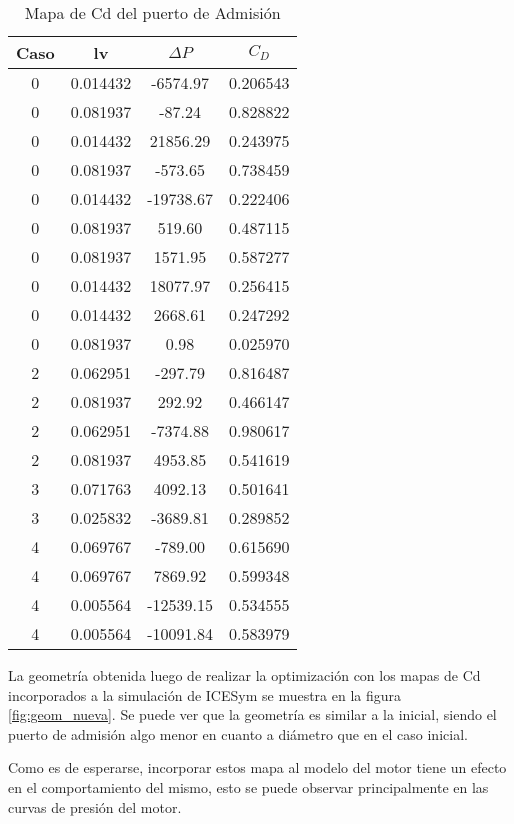 \begin{table}
  \centering
  \begin{tabular}{cccc} \toprule
      Caso  & lv        & $\Delta P$    & $C_{D}$   \\ \midrule
      0     & 0.014432  & -6574.97      &  0.206543 \\
      0     & 0.081937  & -87.24        &  0.828822 \\
      0     & 0.014432  & 21856.29      &  0.243975 \\
      0     & 0.081937  & -573.65       &  0.738459 \\
      0     & 0.014432  & -19738.67     &  0.222406 \\
      0     & 0.081937  & 519.60        &  0.487115 \\
      0     & 0.081937  & 1571.95       &  0.587277 \\
      0     & 0.014432  & 18077.97      &  0.256415 \\
      0     & 0.014432  & 2668.61       &  0.247292 \\
      0     & 0.081937  & 0.98          &  0.025970 \\
      2     & 0.062951  & -297.79       &  0.816487 \\
      2     & 0.081937  & 292.92        &  0.466147 \\
      2     & 0.062951  & -7374.88      &  0.980617 \\
      2     & 0.081937  & 4953.85       &  0.541619 \\
      3     & 0.071763  & 4092.13       &  0.501641 \\
      3     & 0.025832  & -3689.81      &  0.289852 \\
      4     & 0.069767  & -789.00       &  0.615690 \\
      4     & 0.069767  & 7869.92       &  0.599348 \\
      4     & 0.005564  & -12539.15     &  0.534555 \\
      4     & 0.005564  & -10091.84     &  0.583979 \\ \bottomrule
    \end{tabular}
  \caption{Mapa de Cd del puerto de Admisión} \label{tab:mapa_cd_admision}
\end{table}


La geometría obtenida luego de realizar la optimización con los mapas de Cd
incorporados a la simulación de ICESym se muestra en la figura \ref{fig:geom_nueva}.
%
Se puede ver que la geometría es similar a la inicial, siendo el puerto de
admisión algo menor en cuanto a diámetro que en el caso inicial.

Como es de esperarse, incorporar estos mapa al modelo del motor tiene un efecto
en el comportamiento del mismo, esto se puede observar principalmente en las
curvas de presión del motor.

